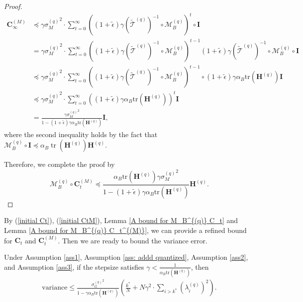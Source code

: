 \documentclass[11pt, letterpaper]{article}
\begin{document}
\begin{proof}
    \begin{equation*}
        \begin{aligned}
            \mathbf{C}_{\infty}^{(M)} & \preceq\gamma{\sigma_M^{(q)}}^2\cdot\sum_{t=0}^\infty((1+\tilde{\epsilon})\gamma(\widetilde{\mathcal{T}}^{(q)})^{-1}\circ\mathcal{M}_B^{(q)})^t\circ\mathbf{I} \\
            &=\gamma{\sigma_M^{(q)}}^2\cdot\sum_{t=0}^\infty((1+\tilde{\epsilon})\gamma(\widetilde{\mathcal{T}}^{(q)})^{-1}\circ\mathcal{M}_B^{(q)})^{t-1}(1+\tilde{\epsilon})\gamma(\widetilde{\mathcal{T}}^{(q)})^{-1}\circ\mathcal{M}_B^{(q)}\circ\mathbf{I} \\
            &\preceq\gamma{\sigma_M^{(q)}}^2\cdot\sum_{t=0}^\infty((1+\tilde{\epsilon})\gamma(\widetilde{\mathcal{T}}^{(q)})^{-1}\circ\mathcal{M}_B^{(q)})^{t-1}\circ(1+\tilde{\epsilon})\gamma\alpha_B\mathrm{tr}(\mathbf{H}^{(q)})\mathbf{I} \\
            &\preceq\gamma{\sigma_M^{(q)}}^2\cdot\sum_{t=0}^\infty\left((1+\tilde{\epsilon})\gamma\alpha_B\mathrm{tr}(\mathbf{H}^{(q)})\right)^{t}\mathbf{I} \\
            &= \frac{\gamma{\sigma_M^{(q)}}^2}{1-(1+\tilde{\epsilon})\gamma\alpha_B\mathrm{tr}(\mathbf{H}^{(q)})}\mathbf{I},
        \end{aligned}
    \end{equation*}
    where the second inequality holds by the fact that $\mathcal{M}_B^{(q)}\circ\mathbf{I}\preceq\alpha_B\operatorname{tr}(\mathbf{H}^{(q)})\mathbf{H}^{(q)}$.
    
    Therefore, we complete the proof by
    \begin{equation*}
        \mathcal{M}_B^{(q)} \circ \mathbf{C}_t^{(M)} \preceq \frac{\alpha_B\mathrm{tr}(\mathbf{H}^{(q)})\gamma{\sigma_M^{(q)}}^2}{1-(1+\tilde{\epsilon})\gamma\alpha_B\mathrm{tr}(\mathbf{H}^{(q)})} \mathbf{H}^{(q)}.
    \end{equation*}
\end{proof}

By (\ref{initial Ct}), (\ref{initial CtM}), Lemma \ref{A bound for M_B^{(q)} C_t} and Lemma \ref{A bound for M_B^{(q)} C_t^{(M)}}, we can provide a refined bound for $\mathbf{C}_t$ and $\mathbf{C}_t^{(M)}$. Then we are ready to bound the variance error.

\begin{lemma}
    \label{variance R2 bound}
    Under Assumption \ref{ass1}, Assumption \ref{ass: addd quantized}, Assumption \ref{ass2}, and Assumption \ref{ass3}, if the stepsize satisfies $\gamma < \frac{1}{\alpha_B\mathrm{tr}(\mathbf{H}^{(q)})}$, then
    \begin{equation*}
        \begin{aligned}
            \mathrm{variance}\leq  \frac{{\sigma_G^{(q)}}^2}{1-\gamma\alpha_B\mathrm{tr}(\mathbf{H}^{(q)})}\left(\frac{k^*}{N}+N\gamma^2\cdot\sum_{i>k^*}(\lambda_i^{(q)})^2\right).
        \end{aligned}
    \end{equation*}
\end{lemma}
\end{document}
